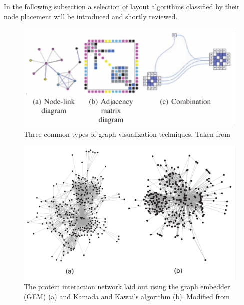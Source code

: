 In the following subsection a selection of layout algorithms classified by their node placement will be introduced and shortly reviewed.
\begin{figure}
    \centering
    \includegraphics[width=\linewidth]{media/vis_types.pdf}
    \caption{Three common types of graph visualization techniques. Taken from \cite{VonLandesberger2011}}
    \label{fig:vis_types}
\end{figure}

\begin{figure}
    \centering
    \includegraphics[scale=0.16]{media/layout_techniques.pdf}
    \caption{The protein interaction network laid out using the graph embedder (GEM) (a) and Kamada and Kawai's algorithm (b). Modified from \cite{Gibson2013}}
    \label{fig:layout_techniques}
\end{figure}
